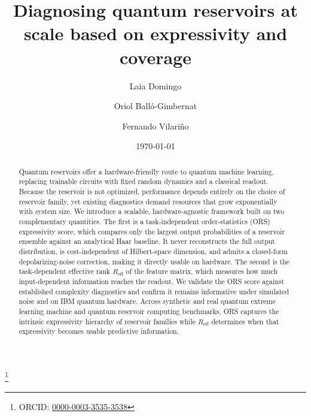 \documentclass[
    aps,
    pre,
    amsmath,
    amssymb,
    reprint,
    superscriptaddress,
    preprintnumbers,
]{revtex4-2}
\begin{document}
\title{Diagnosing quantum reservoirs at scale based on expressivity and coverage}

\author{Laia Domingo}
\thanks{ORCID:
\href{https://orcid.org/0000-0003-3535-3538}
{0000-0003-3535-3538}}

\author{Oriol Balló-Gimbernat}

\author{Fernando Vilariño}

\date{\today}

\begin{abstract}
Quantum reservoirs offer a hardware-friendly route to quantum machine
learning, replacing trainable circuits with fixed random dynamics and a
classical readout. Because the reservoir is not optimized, performance
depends entirely on the choice of reservoir family, yet existing diagnostics
demand resources that grow exponentially with system size. We introduce a
scalable, hardware-agnostic framework built on two complementary quantities.
The first is a task-independent order-statistics (ORS) expressivity score,
which compares only the largest output probabilities of a reservoir ensemble
against an analytical Haar baseline. It never reconstructs the full output
distribution, is cost-independent of Hilbert-space dimension, and admits a
closed-form depolarizing-noise correction, making it directly usable on
hardware. The second is the task-dependent effective rank
$R_{\mathrm{eff}}$ of the feature matrix, which measures how much
input-dependent information reaches the readout. We validate the ORS score
against established complexity diagnostics and confirm it remains informative
under simulated noise and on IBM quantum hardware. Across synthetic and real
quantum extreme learning machine and quantum reservoir computing benchmarks,
ORS captures the intrinsic expressivity hierarchy of reservoir families while
$R_{\mathrm{eff}}$ determines when that expressivity becomes usable
predictive information.
\end{abstract}

\maketitle
\end{document}
